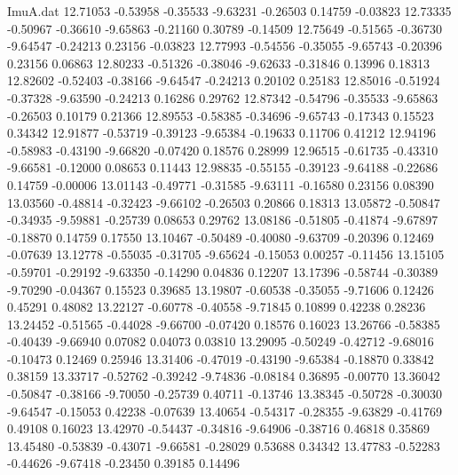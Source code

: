 \begin{filecontents}{ImuA.dat}
  12.71053   -0.53958   -0.35533   -9.63231   -0.26503    0.14759   -0.03823
  12.73335   -0.50967   -0.36610   -9.65863   -0.21160    0.30789   -0.14509
  12.75649   -0.51565   -0.36730   -9.64547   -0.24213    0.23156   -0.03823
  12.77993   -0.54556   -0.35055   -9.65743   -0.20396    0.23156    0.06863
  12.80233   -0.51326   -0.38046   -9.62633   -0.31846    0.13996    0.18313
  12.82602   -0.52403   -0.38166   -9.64547   -0.24213    0.20102    0.25183
  12.85016   -0.51924   -0.37328   -9.63590   -0.24213    0.16286    0.29762
  12.87342   -0.54796   -0.35533   -9.65863   -0.26503    0.10179    0.21366
  12.89553   -0.58385   -0.34696   -9.65743   -0.17343    0.15523    0.34342
  12.91877   -0.53719   -0.39123   -9.65384   -0.19633    0.11706    0.41212
  12.94196   -0.58983   -0.43190   -9.66820   -0.07420    0.18576    0.28999
  12.96515   -0.61735   -0.43310   -9.66581   -0.12000    0.08653    0.11443
  12.98835   -0.55155   -0.39123   -9.64188   -0.22686    0.14759   -0.00006
  13.01143   -0.49771   -0.31585   -9.63111   -0.16580    0.23156    0.08390
  13.03560   -0.48814   -0.32423   -9.66102   -0.26503    0.20866    0.18313
  13.05872   -0.50847   -0.34935   -9.59881   -0.25739    0.08653    0.29762
  13.08186   -0.51805   -0.41874   -9.67897   -0.18870    0.14759    0.17550
  13.10467   -0.50489   -0.40080   -9.63709   -0.20396    0.12469   -0.07639
  13.12778   -0.55035   -0.31705   -9.65624   -0.15053    0.00257   -0.11456
  13.15105   -0.59701   -0.29192   -9.63350   -0.14290    0.04836    0.12207
  13.17396   -0.58744   -0.30389   -9.70290   -0.04367    0.15523    0.39685
  13.19807   -0.60538   -0.35055   -9.71606    0.12426    0.45291    0.48082
  13.22127   -0.60778   -0.40558   -9.71845    0.10899    0.42238    0.28236
  13.24452   -0.51565   -0.44028   -9.66700   -0.07420    0.18576    0.16023
  13.26766   -0.58385   -0.40439   -9.66940    0.07082    0.04073    0.03810
  13.29095   -0.50249   -0.42712   -9.68016   -0.10473    0.12469    0.25946
  13.31406   -0.47019   -0.43190   -9.65384   -0.18870    0.33842    0.38159
  13.33717   -0.52762   -0.39242   -9.74836   -0.08184    0.36895   -0.00770
  13.36042   -0.50847   -0.38166   -9.70050   -0.25739    0.40711   -0.13746
  13.38345   -0.50728   -0.30030   -9.64547   -0.15053    0.42238   -0.07639
  13.40654   -0.54317   -0.28355   -9.63829   -0.41769    0.49108    0.16023
  13.42970   -0.54437   -0.34816   -9.64906   -0.38716    0.46818    0.35869
  13.45480   -0.53839   -0.43071   -9.66581   -0.28029    0.53688    0.34342
  13.47783   -0.52283   -0.44626   -9.67418   -0.23450    0.39185    0.14496

\end{filecontents}
